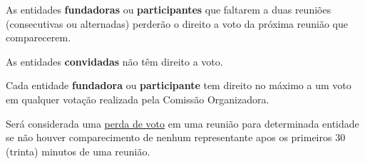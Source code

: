 \begin{article}
	As entidades \textbf{fundadoras} ou \textbf{participantes} que faltarem a duas reuniões (consecutivas ou alternadas) perderão o direito a voto da próxima reunião que comparecerem.

	\begin{xparagraph}
		As entidades \textbf{convidadas} não têm direito a voto.
	\end{xparagraph}

	\begin{xparagraph}
		Cada entidade \textbf{fundadora} ou \textbf{participante} tem direito no máximo a um voto em qualquer votação realizada pela Comissão Organizadora.
	\end{xparagraph}

	\begin{xparagraph}
		Será considerada uma \underline{perda de voto} em uma reunião para determinada entidade se não houver comparecimento de nenhum representante apos os primeiros 30 (trinta) minutos de uma reunião.
	\end{xparagraph}
\end{article}

